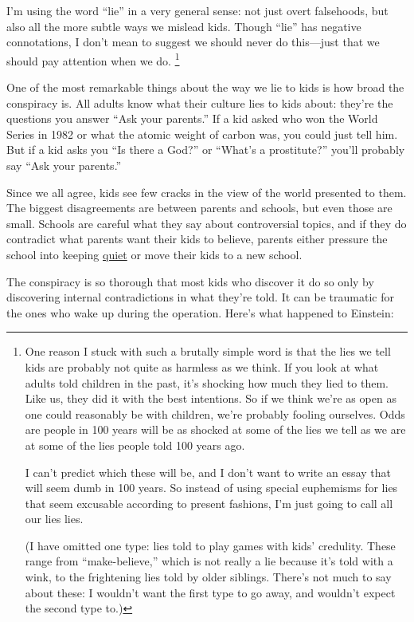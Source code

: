 \documentclass[12pt]{book}
\begin{document}
I'm using the word ``lie'' in a very general sense: not just overt
falsehoods, but also all the more subtle ways we mislead kids. Though
``lie'' has negative connotations, I don't mean to suggest we should
never do this---just that we should pay attention when we do.
\footnote{One reason I stuck with such a brutally simple word is that the
lies we tell kids are probably not quite as harmless as we think. If you
look at what adults told children in the past, it's shocking how much
they lied to them. Like us, they did it with the best intentions. So if
we think we're as open as one could reasonably be with children, we're
probably fooling ourselves. Odds are people in 100 years will be as
shocked at some of the lies we tell as we are at some of the lies people
told 100 years ago.

I can't predict which these will be, and I don't want to write an essay
that will seem dumb in 100 years. So instead of using special euphemisms
for lies that seem excusable according to present fashions, I'm just
going to call all our lies lies.

(I have omitted one type: lies told to play games with kids' credulity.
These range from ``make-believe,'' which is not really a lie because
it's told with a wink, to the frightening lies told by older siblings.
There's not much to say about these: I wouldn't want the first type to
go away, and wouldn't expect the second type to.)}

One of the most remarkable things about the way we lie to kids is how
broad the conspiracy is. All adults know what their culture lies to kids
about: they're the questions you answer ``Ask your parents.'' If a kid
asked who won the World Series in 1982 or what the atomic weight of
carbon was, you could just tell him. But if a kid asks you ``Is there a
God?'' or ``What's a prostitute?'' you'll probably say ``Ask your
parents.''

Since we all agree, kids see few cracks in the view of the world
presented to them. The biggest disagreements are between parents and
schools, but even those are small. Schools are careful what they say
about controversial topics, and if they do contradict what parents want
their kids to believe, parents either pressure the school into keeping
\href{http://www.google.com/search?q=parents+complain+inappropriate+book}{quiet}
or move their kids to a new school.

The conspiracy is so thorough that most kids who discover it do so only
by discovering internal contradictions in what they're told. It can be
traumatic for the ones who wake up during the operation. Here's what
happened to Einstein:
\end{document}

